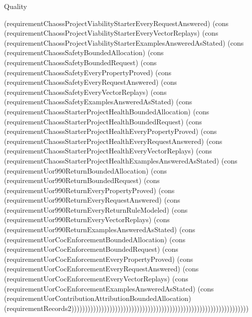 \begin{lexlean}{Quality}
\begin{semanticmodule}
{(requirementChaossProjectViabilityStarterEveryRequestAnswered) (cons (requirementChaossProjectViabilityStarterEveryVectorReplays) (cons (requirementChaossProjectViabilityStarterExamplesAnsweredAsStated) (cons (requirementChaossSafetyBoundedAllocation) (cons (requirementChaossSafetyBoundedRequest) (cons (requirementChaossSafetyEveryPropertyProved) (cons (requirementChaossSafetyEveryRequestAnswered) (cons (requirementChaossSafetyEveryVectorReplays) (cons (requirementChaossSafetyExamplesAnsweredAsStated) (cons (requirementChaossStarterProjectHealthBoundedAllocation) (cons (requirementChaossStarterProjectHealthBoundedRequest) (cons (requirementChaossStarterProjectHealthEveryPropertyProved) (cons (requirementChaossStarterProjectHealthEveryRequestAnswered) (cons (requirementChaossStarterProjectHealthEveryVectorReplays) (cons (requirementChaossStarterProjectHealthExamplesAnsweredAsStated) (cons (requirementUor990ReturnBoundedAllocation) (cons (requirementUor990ReturnBoundedRequest) (cons (requirementUor990ReturnEveryPropertyProved) (cons (requirementUor990ReturnEveryRequestAnswered) (cons (requirementUor990ReturnEveryReturnRuleModeled) (cons (requirementUor990ReturnEveryVectorReplays) (cons (requirementUor990ReturnExamplesAnsweredAsStated) (cons (requirementUorCocEnforcementBoundedAllocation) (cons (requirementUorCocEnforcementBoundedRequest) (cons (requirementUorCocEnforcementEveryPropertyProved) (cons (requirementUorCocEnforcementEveryRequestAnswered) (cons (requirementUorCocEnforcementEveryVectorReplays) (cons (requirementUorCocEnforcementExamplesAnsweredAsStated) (cons (requirementUorContributionAttributionBoundedAllocation) (requirementRecords2)))))))))))))))))))))))))))))))))))))))))))))))))))))))))))))))))
}


\end{semanticmodule}
\end{lexlean}
